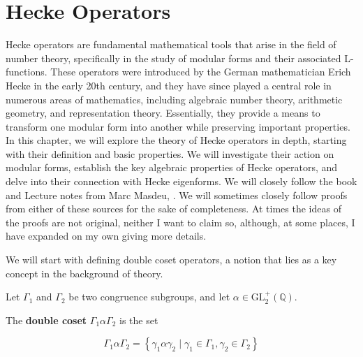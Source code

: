 \section{Hecke Operators}

\label{Hecke}

Hecke operators are fundamental mathematical tools that arise in the field of number theory, specifically in the study of modular forms and their associated L-functions. These operators were introduced by the German mathematician Erich Hecke in the early 20th century, and they have since played a central role in numerous areas of mathematics, including algebraic number theory, arithmetic geometry, and representation theory. Essentially, they provide a means to transform one modular form into another while preserving important properties. In this chapter, we will explore the theory of Hecke operators in depth, starting with their definition and basic properties. We will investigate their action on modular forms, establish the key algebraic properties of Hecke operators, and delve into their connection with Hecke eigenforms. We will closely follow the book \cite{diamond2005first} and Lecture notes from Marc Masdeu, \cite{Masdeu2015ModularForms}. We will sometimes closely follow proofs from either of these sources for the sake of completeness. At times the ideas of the proofs are not original, neither I want to claim so, although, at some places,  I have expanded on my own giving more details.  

We will start with defining double coset operators, a notion that lies as a key concept in the background of theory. 
\begin{definition}
    Let $\Gamma_{1}$ and $\Gamma_{2}$ be two congruence subgroups, and let $\alpha \in \mathrm{GL}_{2}^{+}(\mathbb{Q})$.

The \textbf{double coset} $\Gamma_{1} \alpha \Gamma_{2}$ is the set

$$
\Gamma_{1} \alpha \Gamma_{2}=\left\{\gamma_{1} \alpha \gamma_{2} \mid \gamma_{1} \in \Gamma_{1}, \gamma_{2} \in \Gamma_{2}\right\}
$$

\end{definition}

